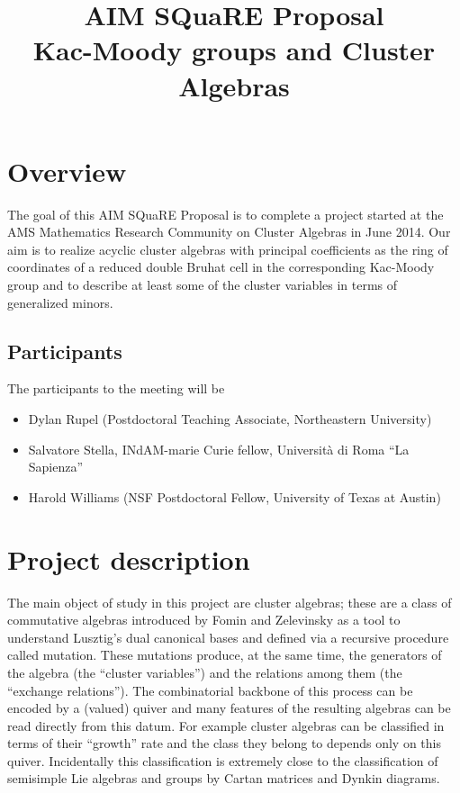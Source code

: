 \documentclass{amsart}
\title[\small{Kac-Moody groups and Cluster Algebras}]
  {AIM SQuaRE Proposal\\ 
  \small{Kac-Moody groups and Cluster Algebras}}
\begin{document}
  \maketitle
  
  \section*{Overview}
    The goal of this AIM SQuaRE Proposal is to complete a project started at the AMS Mathematics Research Community on Cluster Algebras in June 2014.
    Our aim is to realize acyclic cluster algebras with principal coefficients as the ring of coordinates of a reduced double Bruhat cell in the corresponding Kac-Moody group and to describe at least some of the cluster variables in terms of generalized minors.
    
  \subsection*{Participants}
    The participants to the meeting will be 
    \begin{itemize}
      \item Dylan Rupel (Postdoctoral Teaching Associate, Northeastern University)
      \item Salvatore Stella, INdAM-marie Curie fellow, Università di Roma ``La Sapienza''
      \item Harold Williams (NSF Postdoctoral Fellow, University of Texas at Austin) 
    \end{itemize}
  
  \section*{Project description}

  The main object of study in this project are cluster algebras; these are a class of commutative algebras introduced by Fomin and Zelevinsky as a tool to understand Lusztig's dual canonical bases and  defined via a recursive procedure called mutation. 
  These mutations produce, at the same time, the generators of the algebra (the ``cluster variables'') and the relations among them (the ``exchange relations'').
  The combinatorial backbone of this process can be encoded by a (valued) quiver and many features of the resulting algebras can be read directly from this datum.
  For example cluster algebras can be classified in terms of their ``growth'' rate and the class they belong to depends only on this quiver.
  Incidentally this classification is extremely close to the classification of semisimple Lie algebras and groups by Cartan matrices and Dynkin diagrams. 
\end{document}
